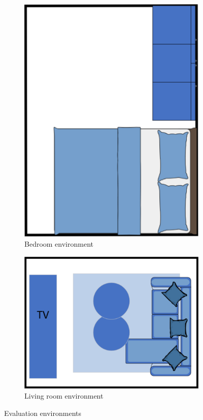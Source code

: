 \begin{figure}[H]
\begin{subfigure}{0.35\textwidth}
        \includegraphics[width=\linewidth]{figures/Liveroom2.png}
        \caption{Bedroom environment}
        \label{fig:Liveroom2}
    \end{subfigure}
    \hfill
    \begin{subfigure}{0.45\textwidth}
        \centering
        \includegraphics[width=\linewidth]{figures/Liveroom3.png}
        \caption{Living room environment}
        \label{fig:Liveroom3}
    \end{subfigure}
    
    \caption{Evaluation environments}
    \label{fig:Liveroom}
\end{figure}

